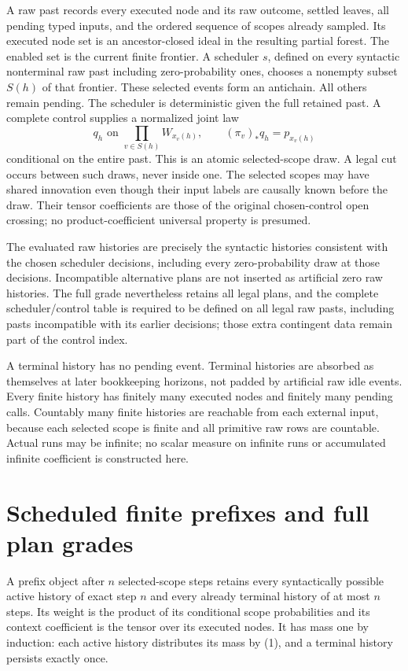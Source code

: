 \documentclass[11pt]{article}
\begin{document}
A raw past records every executed node and its raw outcome, settled leaves, all pending typed inputs, and the ordered sequence of scopes already sampled. Its executed node set is an ancestor-closed ideal in the resulting partial forest. The enabled set is the current finite frontier. A scheduler $s$, defined on every syntactic nonterminal raw past including zero-probability ones, chooses a nonempty subset $S(h)$ of that frontier. These selected events form an antichain. All others remain pending. The scheduler is deterministic given the full retained past. A complete control supplies a normalized joint law
\[
 q_h\text{ on }\prod_{v\in S(h)}W_{x_v(h)},\qquad
 (\pi_v)_*q_h=p_{x_v(h)}                                   \tag{1}
\]
conditional on the entire past. This is an atomic selected-scope draw. A legal cut occurs between such draws, never inside one. The selected scopes may have shared innovation even though their input labels are causally known before the draw. Their tensor coefficients are those of the original chosen-control open crossing; no product-coefficient universal property is presumed.

The evaluated raw histories are precisely the syntactic histories consistent with the chosen scheduler decisions, including every zero-probability draw at those decisions. Incompatible alternative plans are not inserted as artificial zero raw histories. The full grade nevertheless retains all legal plans, and the complete scheduler/control table is required to be defined on all legal raw pasts, including pasts incompatible with its earlier decisions; those extra contingent data remain part of the control index.

A terminal history has no pending event. Terminal histories are absorbed as themselves at later bookkeeping horizons, not padded by artificial raw idle events. Every finite history has finitely many executed nodes and finitely many pending calls. Countably many finite histories are reachable from each external input, because each selected scope is finite and all primitive raw rows are countable. Actual runs may be infinite; no scalar measure on infinite runs or accumulated infinite coefficient is constructed here.

\section{Scheduled finite prefixes and full plan grades}
A prefix object after $n$ selected-scope steps retains every syntactically possible active history of exact step $n$ and every already terminal history of at most $n$ steps. Its weight is the product of its conditional scope probabilities and its context coefficient is the tensor over its executed nodes. It has mass one by induction: each active history distributes its mass by (1), and a terminal history persists exactly once.
\end{document}
